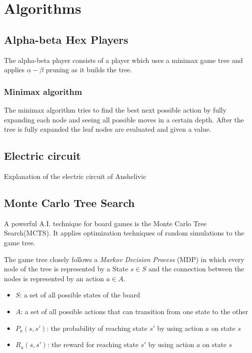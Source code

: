 \documentclass{ba-kecs}
\begin{document}
\section{Algorithms}
\subsection{Alpha-beta Hex Players}
The alpha-beta player consists of a player which uses a minimax game tree and applies $\alpha - \beta$ pruning as it builds the tree.
\subsubsection{Minimax algorithm}
The minimax algorithm tries to find the best next possible action by fully expanding each node and seeing all possible moves in a certain depth. After the tree is fully expanded the leaf nodes are evaluated and given a value. 

\subsection{Electric circuit}
Explanation of the electric circuit of Anshelivic

\subsection{Monte Carlo Tree Search}
A powerful A.I. technique for board games is the Monte Carlo Tree Search(MCTS). It applies optimization techniques of random simulations to the game tree. 

The game tree closely follows a \textit{Markov Decision Process} (MDP) in which every node of the tree is represented by a State $s \in S$ and the connection between the nodes is represented by an action $a \in A$.
\begin{itemize}
\item $S$: a set of all possible states of the board
\item $A$: a set of all possible actions that can transition from one state to the other
\item $P_a(s, s')$: the probability of reaching state $s'$ by using action $a$ on state $s$
\item $R_a(s, s')$: the reward for reaching state $s'$ by using action $a$ on state $s$
\end{itemize}
\end{document}
